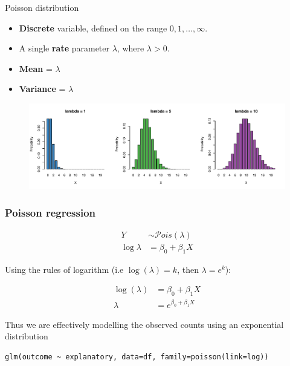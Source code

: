 \documentclass[pdf,handout]{beamer}
\begin{document}
\begin{frame}{Poisson distribution}

\begin{itemize}\addtolength{\itemsep}{.5\baselineskip}
    \item \textbf{Discrete} variable, defined on the range $0, 1, \dots, \infty$.
    \item  A single \textbf{rate} parameter $\lambda$, where $\lambda > 0$.
    \item \textbf{Mean} = $\lambda$  
    \item \textbf{Variance} = $\lambda$
\end{itemize}

\begin{figure}
\includegraphics[width=.95\textwidth]{poissondist.pdf}
\end{figure}

\end{frame}

\begin{frame}[fragile]
\frametitle{Poisson regression}

$$
\begin{aligned}
Y & \sim \mathcal{P}ois(\lambda) \\
\log{\lambda} & = \beta_0 + \beta_1X
\end{aligned}
$$

\vfill
Using the rules of logarithm (i.e $\log({\lambda}) = k$, then $\lambda = e^k$):

$$
\begin{aligned}
\log({\lambda}) & = \beta_0 + \beta_1X \\
\lambda & = e^{\beta_0 + \beta_1X }
\end{aligned}
$$

\vfill
Thus we are effectively modelling the observed counts using an exponential distribution

\begin{lstlisting}[style=R]
glm(outcome ~ explanatory, data=df, family=poisson(link=log))
\end{lstlisting}


\end{frame}
\end{document}
